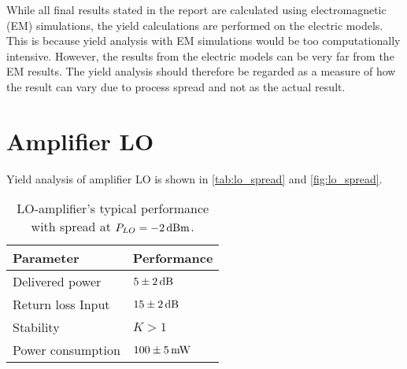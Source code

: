 		While all final results stated in the report are calculated using electromagnetic (EM) simulations, the yield calculations are performed on the electric models. This is because yield analysis with EM simulations would be too computationally intensive. However, the results from the electric models can be very far from the EM results. The yield analysis should therefore be regarded as a measure of how the result can vary due to process spread and not as the actual result.


	\section{Amplifier LO}\label{yieldlo}
		Yield analysis of amplifier LO is shown in \autoref{tab:lo_spread} and \autoref{fig:lo_spread}.


		\begin{table}[hbt!]
			\caption[LO-amplifier's performance with spread.]{LO-amplifier's typical performance with spread at $P_{LO}=\unit[-2]{dBm}$.}
			\label{tab:lo_spread}
			\centering
			\begin{tabular}{ l l } \toprule
				Parameter & Performance \\\midrule
				Delivered power & $\unit[5\pm2]{dB}$ \\
				Return loss Input & $\unit[15\pm2 ]{dB}$ \\
				Stability & $K>1$ \\
				Power consumption &  $\unit[100\pm 5]{mW}$ \\\bottomrule
			\end{tabular}
		\end{table}


